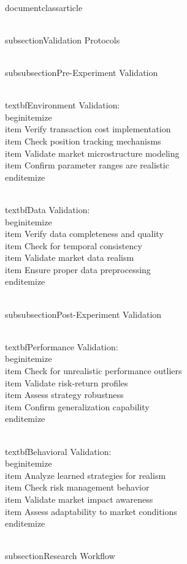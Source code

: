 \\documentclass{article}
\begin{document}
\\subsection{Validation Protocols}

\\subsubsection{Pre-Experiment Validation}

\\textbf{Environment Validation}:
\\begin{itemize}
\\item Verify transaction cost implementation
\\item Check position tracking mechanisms
\\item Validate market microstructure modeling
\\item Confirm parameter ranges are realistic
\\end{itemize}

\\textbf{Data Validation}:
\\begin{itemize}
\\item Verify data completeness and quality
\\item Check for temporal consistency
\\item Validate market data realism
\\item Ensure proper data preprocessing
\\end{itemize}

\\subsubsection{Post-Experiment Validation}

\\textbf{Performance Validation}:
\\begin{itemize}
\\item Check for unrealistic performance outliers
\\item Validate risk-return profiles
\\item Assess strategy robustness
\\item Confirm generalization capability
\\end{itemize}

\\textbf{Behavioral Validation}:
\\begin{itemize}
\\item Analyze learned strategies for realism
\\item Check risk management behavior
\\item Validate market impact awareness
\\item Assess adaptability to market conditions
\\end{itemize}

\\subsection{Research Workflow}
\end{document}
